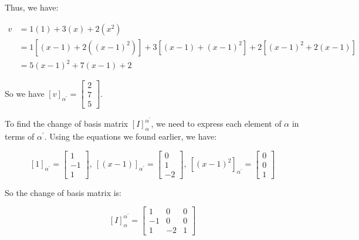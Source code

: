 \documentclass[fontsize=12pt]{scrartcl}
\begin{document}
\noindent
Thus, we have:

\begin{align*}
v &= 1(1) + 3(x) + 2(x^2) \\
&= 1[(x-1)+2((x-1)^2)] + 3[(x-1)+(x-1)^2] + 2[(x-1)^2+2(x-1)] \\
&= 5(x-1)^2 + 7(x-1) + 2
\end{align*}

\noindent
So we have $[v]_{\alpha^{\prime}} = \begin{bmatrix} 2 \\ 7 \\ 5 \end{bmatrix}$.

\noindent
To find the change of basis matrix $[I]_{\alpha}^{\alpha^{\prime}}$, we need to express each element of $\alpha$ in terms of $\alpha^{\prime}$. Using the equations we found earlier, we have:

$$[1]_{\alpha^{\prime}} = \begin{bmatrix} 1 \\ -1 \\ 1 \end{bmatrix},\ [(x - 1)]_{\alpha^{\prime}} = \begin{bmatrix} 0 \\ 1 \\ -2 \end{bmatrix}, \ [(x - 1)^2]_{\alpha^{\prime}} = \begin{bmatrix} 0 \\ 0 \\ 1 \end{bmatrix}$$

\noindent
So the change of basis matrix is:

$$[I]_{\alpha}^{\alpha^{\prime}} = \begin{bmatrix} 1 & 0 & 0 \\ -1 & 0 & 0 \\ 1  & -2 & 1 \end{bmatrix} $$
\end{document}

